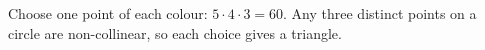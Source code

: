 Choose one point of each colour: $5\cdot4\cdot3=\boxed{60}$. Any three distinct points on a circle are non-collinear, so each choice gives a triangle.
